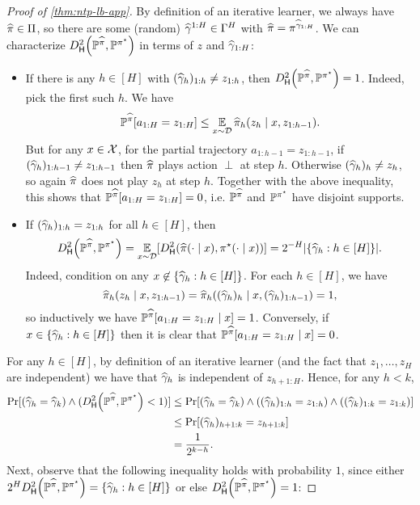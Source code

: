 \begin{proof}[Proof of \cref{thm:ntp-lb-app}]
By definition of an iterative learner, we always have $\widehat{\pi}\in\Pi$, so there are some (random) $\widehat{\gamma}^{1:H} \in \Gamma^H$ with $\widehat{\pi} = \pi^{\widehat{\gamma}_{1:H}}$. We can characterize $\Dhels{\BP^{\pihat}}{\BP^{\pistar}}$ in terms of $z$ and $\widehat{\gamma}_{1:H}$: %
\begin{itemize}
    \item If there is any $h \in [H]$ with $(\widehat{\gamma}_h)_{1:h} \neq z_{1:h}$, then $\Dhels{\BP^{\pihat}}{\BP^{\pistar}} = 1$. Indeed, pick the first such $h$. We have
    \[\mathbb{P}^{\widehat{\pi}}[a_{1:H}=z_{1:H}] \leq \operatorname*{\mathbb{E}}_{x\sim\mathcal{D}} \widehat{\pi}_h(z_h\mid{}x,z_{1:h-1}).\]
    But for any $x\in\mathcal{X}$, for the partial trajectory $a_{1:h-1} = z_{1:h-1}$, if $(\widehat{\gamma}_h)_{1:h-1} \neq z_{1:h-1}$ then $\widehat{\pi}$ plays action $\perp$ at step $h$. Otherwise $(\widehat{\gamma}_h)_h \neq z_h$, so again $\widehat{\pi}$ does not play $z_h$ at step $h$. Together with the above inequality, this shows that $\mathbb{P}^{\widehat{\pi}}[a_{1:H}=z_{1:H}] = 0$, i.e. $\mathbb{P}^{\widehat{\pi}}$ and $\mathbb{P}^{\pi^{\star}}$ have disjoint supports.
    \item If $(\widehat{\gamma}_h)_{1:h} = z_{1:h}$ for all $h \in [H]$, then \begin{equation} \Dhels{\BP^{\pihat}}{\BP^{\pistar}} = \EE_{x\sim\MD}[\Dhels{\pihat(\cdot\mid{}x)}{\pistar(\cdot\mid{}x)}] = 2^{-H}|\{\wh\gamma_h: h \in [H]\}|.\label{eq:consensus-bound}\end{equation}
    Indeed, condition on any $x \not \in \{\widehat{\gamma}_h:h\in[H]\}$. For each $h \in [H]$, we have
    \[\widehat{\pi}_h(z_h\mid{}x,z_{1:h-1}) = \widehat{\pi}_h((\widehat{\gamma}_h)_h\mid{}x,(\widehat{\gamma}_h)_{1:h-1}) = 1,\]
    so inductively we have $\mathbb{P}^{\widehat{\pi}}[a_{1:H}=z_{1:H}\mid{}x] = 1$. Conversely, if $x \in \{\widehat{\gamma}_h:h\in[H]\}$ then it is clear that $\mathbb{P}^{\widehat{\pi}}[a_{1:H}=z_{1:H}\mid{}x] = 0$.
\end{itemize}
For any $h \in [H]$, by definition of an iterative learner (and the fact that $z_1,\dots,z_H$ are independent) we have that $\widehat{\gamma}_h$ is independent of $z_{h+1:H}$. Hence, for any $h < k$,
\begin{align}
\Pr[(\wh\gamma_h = \wh\gamma_k) \land (\Dhels{\BP^{\pihat}}{\BP^{\pistar}} < 1)]
&\leq \Pr[(\wh\gamma_h = \wh\gamma_k) \land ((\wh\gamma_h)_{1:h} = z_{1:h}) \land ((\wh\gamma_k)_{1:k} = z_{1:k})] \\ 
&\leq \Pr[(\wh\gamma_h)_{h+1:k} = z_{h+1:k}] \\ 
&= \frac{1}{2^{k-h}}.\label{eq:agreement-ub}
\end{align}
Next, observe that the following inequality holds with probability $1$, since either $2^H \Dhels{\BP^{\pihat}}{\BP^{\pistar}} = \{\wh\gamma_h: h \in [H]\}$ or else $\Dhels{\BP^{\pihat}}{\BP^{\pistar}} = 1$:

\end{proof}
